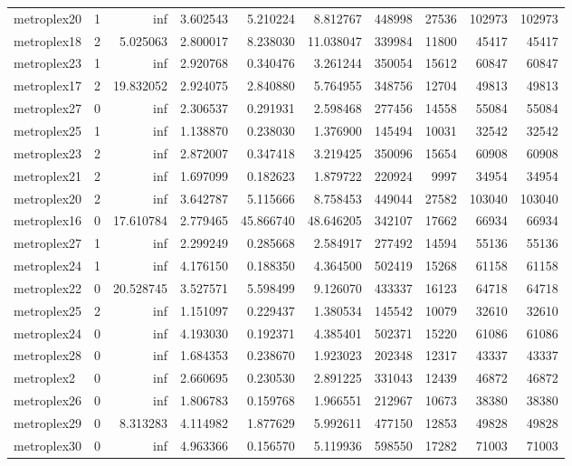 \begin{longtable}{|l|r|r|r|r|r|r|r|r|r|}
metroplex20 & 1 & inf & 3.602543 & 5.210224 & 8.812767 & 448998 & 27536 & 102973 & 102973 \\
metroplex18 & 2 & 5.025063 & 2.800017 & 8.238030 & 11.038047 & 339984 & 11800 & 45417 & 45417 \\
metroplex23 & 1 & inf & 2.920768 & 0.340476 & 3.261244 & 350054 & 15612 & 60847 & 60847 \\
metroplex17 & 2 & 19.832052 & 2.924075 & 2.840880 & 5.764955 & 348756 & 12704 & 49813 & 49813 \\
metroplex27 & 0 & inf & 2.306537 & 0.291931 & 2.598468 & 277456 & 14558 & 55084 & 55084 \\
metroplex25 & 1 & inf & 1.138870 & 0.238030 & 1.376900 & 145494 & 10031 & 32542 & 32542 \\
metroplex23 & 2 & inf & 2.872007 & 0.347418 & 3.219425 & 350096 & 15654 & 60908 & 60908 \\
metroplex21 & 2 & inf & 1.697099 & 0.182623 & 1.879722 & 220924 & 9997 & 34954 & 34954 \\
metroplex20 & 2 & inf & 3.642787 & 5.115666 & 8.758453 & 449044 & 27582 & 103040 & 103040 \\
metroplex16 & 0 & 17.610784 & 2.779465 & 45.866740 & 48.646205 & 342107 & 17662 & 66934 & 66934 \\
metroplex27 & 1 & inf & 2.299249 & 0.285668 & 2.584917 & 277492 & 14594 & 55136 & 55136 \\
metroplex24 & 1 & inf & 4.176150 & 0.188350 & 4.364500 & 502419 & 15268 & 61158 & 61158 \\
metroplex22 & 0 & 20.528745 & 3.527571 & 5.598499 & 9.126070 & 433337 & 16123 & 64718 & 64718 \\
metroplex25 & 2 & inf & 1.151097 & 0.229437 & 1.380534 & 145542 & 10079 & 32610 & 32610 \\
metroplex24 & 0 & inf & 4.193030 & 0.192371 & 4.385401 & 502371 & 15220 & 61086 & 61086 \\
metroplex28 & 0 & inf & 1.684353 & 0.238670 & 1.923023 & 202348 & 12317 & 43337 & 43337 \\
metroplex2 & 0 & inf & 2.660695 & 0.230530 & 2.891225 & 331043 & 12439 & 46872 & 46872 \\
metroplex26 & 0 & inf & 1.806783 & 0.159768 & 1.966551 & 212967 & 10673 & 38380 & 38380 \\
metroplex29 & 0 & 8.313283 & 4.114982 & 1.877629 & 5.992611 & 477150 & 12853 & 49828 & 49828 \\
metroplex30 & 0 & inf & 4.963366 & 0.156570 & 5.119936 & 598550 & 17282 & 71003 & 71003 \\

\end{longtable}
